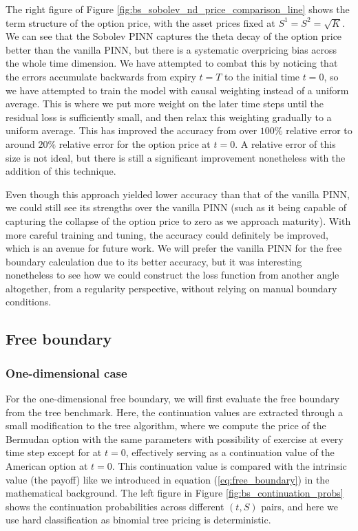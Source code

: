 The right figure of Figure \ref{fig:bs_sobolev_nd_price_comparison_line} shows the term structure of the option price, with the asset prices fixed at $S^1 = S^2 = \sqrt{K}$. We can see that the Sobolev PINN captures the theta decay of the option price better than the vanilla PINN, but there is a systematic overpricing bias across the whole time dimension. We have attempted to combat this by noticing that the errors accumulate backwards from expiry $t=T$ to the initial time $t=0$, so we have attempted to train the model with causal weighting instead of a uniform average. This is where we put more weight on the later time steps until the residual loss is sufficiently small, and then relax this weighting gradually to a uniform average. This has improved the accuracy from over $100\%$ relative error to around $20\%$ relative error for the option price at $t=0$. A relative error of this size is not ideal, but there is still a significant improvement nonetheless with the addition of this technique.

Even though this approach yielded lower accuracy than that of the vanilla PINN, we could still see its strengths over the vanilla PINN (such as it being capable of capturing the collapse of the option price to zero as we approach maturity). With more careful training and tuning, the accuracy could definitely be improved, which is an avenue for future work. We will prefer the vanilla PINN for the free boundary calculation due to its better accuracy, but it was interesting nonetheless to see how we could construct the loss function from another angle altogether, from a regularity perspective, without relying on manual boundary conditions.

\subsection{Free boundary}

\subsubsection{One-dimensional case}

For the one-dimensional free boundary, we will first evaluate the free boundary from the tree benchmark. Here, the continuation values are extracted through a small modification to the tree algorithm, where we compute the price of the Bermudan option with the same parameters with possibility of exercise at every time step except for at $t=0$, effectively serving as a continuation value of the American option at $t=0$. This continuation value is compared with the intrinsic value (the payoff) like we introduced in equation (\ref{eq:free_boundary}) in the mathematical background. The left figure in Figure \ref{fig:bs_continuation_probs} shows the continuation probabilities across different $(t, S)$ pairs, and here we use hard classification as binomial tree pricing is deterministic.

